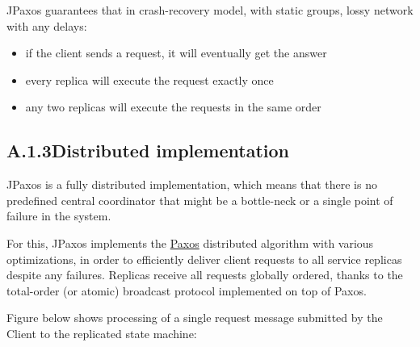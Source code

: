 JPaxos guarantees that in crash-recovery model, with static groups,
lossy network with any delays:
\begin{itemize}
\item {} 
if the client sends a request, it will eventually get the answer

\item {} 
every replica will execute the request exactly once

\item {} 
any two replicas will execute the requests in the same order

\end{itemize}


\subsection*{A.1.3\quad Distributed implementation}
\label{overview:distributed-implementation}
JPaxos is a fully distributed implementation, which means that there
is no predefined central coordinator that might be a bottle-neck or a single
point of failure in the system.

For this, JPaxos implements
the \href{http://en.wikipedia.org/wiki/Paxos\_algorithm}{Paxos}
distributed algorithm with various optimizations, in order to efficiently
deliver client requests to all service replicas despite any failures.
Replicas receive all requests globally ordered, thanks to
the total-order (or atomic) broadcast protocol implemented on top
of Paxos.

Figure below shows processing of a single request message submitted
by the Client to the replicated state machine:
\begin{quote}
\begin{figure}[htbp]
\centering

\end{figure}
\end{quote}

